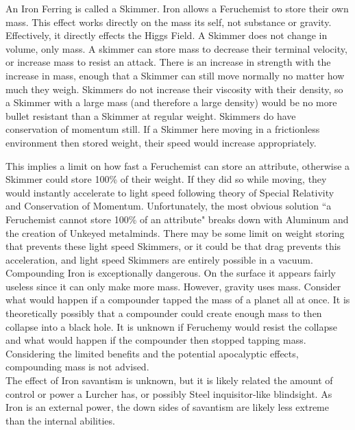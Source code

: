 \documentclass[conference]{IEEEtran}
\begin{document}
An Iron Ferring is called a Skimmer.  Iron allows a Feruchemist to store their own mass.  This effect works directly on the mass its self, not substance or gravity.  Effectively, it directly effects the Higgs Field. A Skimmer does not change in volume, only mass.  A skimmer can store mass to decrease their terminal velocity, or increase mass to resist an attack.  There is an increase in strength with the increase in mass, enough that a Skimmer can still move normally no matter how much they weigh.  
Skimmers do not increase their viscosity with their density, so a Skimmer with a large mass (and therefore a large density) would be no more bullet resistant than a Skimmer at regular weight.
Skimmers do have conservation of momentum still.  If a Skimmer here moving in a frictionless environment then stored weight, their speed would increase appropriately.

This implies a limit on how fast a Feruchemist can store an attribute, otherwise a Skimmer could store 100\% of their weight.  If they did so while moving, they would instantly accelerate to light speed following theory of Special Relativity and Conservation of Momentum.  Unfortunately, the most obvious solution ``a Feruchemist cannot store 100\% of an attribute" breaks down with Aluminum and the creation of Unkeyed metalminds.  There may be some limit on weight storing that prevents these light speed Skimmers, or it could be that drag prevents this acceleration, and light speed Skimmers are entirely possible in a vacuum.\\

Compounding Iron is exceptionally dangerous.  On the surface it appears fairly useless since it can only make more mass.  However, gravity uses mass.  Consider what would happen if a compounder tapped the mass of a planet all at once.  It is theoretically possibly that a compounder could create enough mass to then collapse into a black hole.  It is unknown if Feruchemy would resist the collapse and what would happen if the compounder then stopped tapping mass.
Considering the limited benefits and the potential apocalyptic effects, compounding mass is not advised. \\

The effect of Iron savantism is unknown, but it is likely related the amount of control or power a Lurcher has, or possibly Steel inquisitor-like blindsight.  As Iron is an external power, the down sides of savantism are likely less extreme than the internal abilities.\\
\end{document}
